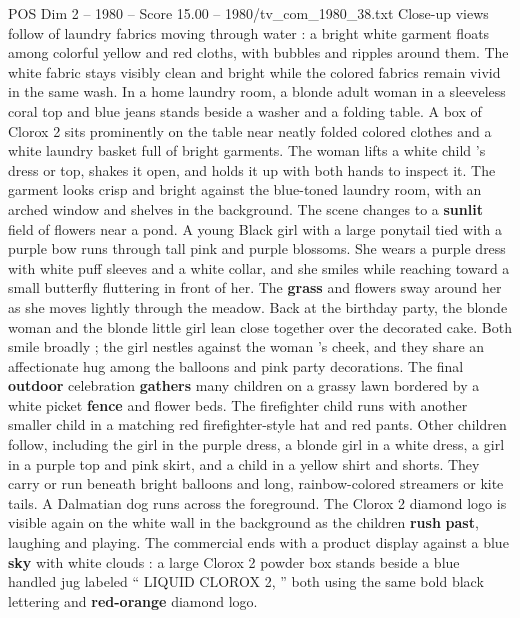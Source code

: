 \begin{textsample}{POS Dim 2 – 1980 – Score 15.00 – 1980/tv\_com\_1980\_38.txt}
Close-up views follow of laundry fabrics moving through water : a bright white garment floats among colorful yellow and red cloths, with bubbles and ripples around them.
The white fabric stays visibly clean and bright while the colored fabrics remain vivid in the same wash.
In a home laundry room, a blonde adult woman in a sleeveless coral top and blue jeans stands beside a washer and a folding table.
A box of Clorox 2 sits prominently on the table near neatly folded colored clothes and a white laundry basket full of bright garments.
The woman lifts a white child ’s dress or top, shakes it open, and holds it up with both hands to inspect it.
The garment looks crisp and bright against the blue-toned laundry room, with an arched window and shelves in the background.
The scene changes to a \textbf{sunlit} field of flowers near a pond.
A young Black girl with a large ponytail tied with a purple bow runs through tall pink and purple blossoms.
She wears a purple dress with white puff sleeves and a white collar, and she smiles while reaching toward a small butterfly fluttering in front of her.
The \textbf{grass} and flowers sway around her as she moves lightly through the meadow.
Back at the birthday party, the blonde woman and the blonde little girl lean close together over the decorated cake.
Both smile broadly ; the girl nestles against the woman ’s cheek, and they share an affectionate hug among the balloons and pink party decorations.
The final \textbf{outdoor} celebration \textbf{gathers} many children on a grassy lawn bordered by a white picket \textbf{fence} and flower beds.
The firefighter child runs with another smaller child in a matching red firefighter-style hat and red pants.
Other children follow, including the girl in the purple dress, a blonde girl in a white dress, a girl in a purple top and pink skirt, and a child in a yellow shirt and shorts.
They carry or run beneath bright balloons and long, rainbow-colored streamers or kite tails.
A Dalmatian dog runs across the foreground.
The Clorox 2 diamond logo is visible again on the white wall in the background as the children \textbf{rush} \textbf{past}, laughing and playing.
The commercial ends with a product display against a blue \textbf{sky} with white clouds : a large Clorox 2 powder box stands beside a blue handled jug labeled “ LIQUID CLOROX 2, ” both using the same bold black lettering and \textbf{red-orange} diamond logo.

\end{textsample}
